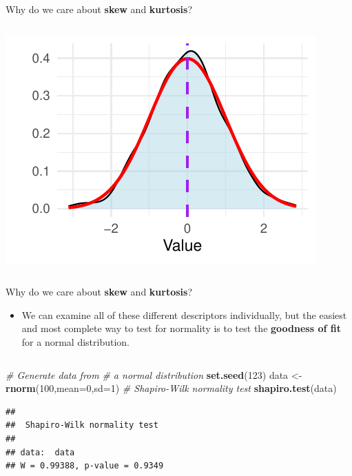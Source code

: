 \documentclass[
  ignorenonframetext,
]{beamer}
\newenvironment{Shaded}{\begin{snugshade}}{\end{snugshade}}
\newcommand{\AttributeTok}[1]{\textcolor[rgb]{0.13,0.29,0.53}{#1}}
\newcommand{\CommentTok}[1]{\textcolor[rgb]{0.56,0.35,0.01}{\textit{#1}}}
\newcommand{\DecValTok}[1]{\textcolor[rgb]{0.00,0.00,0.81}{#1}}
\newcommand{\FunctionTok}[1]{\textcolor[rgb]{0.13,0.29,0.53}{\textbf{#1}}}
\newcommand{\NormalTok}[1]{#1}
\newcommand{\OtherTok}[1]{\textcolor[rgb]{0.56,0.35,0.01}{#1}}
\providecommand{\tightlist}{%
  \setlength{\itemsep}{0pt}\setlength{\parskip}{0pt}}
\begin{document}
\begin{frame}{Why do we care about \textbf{skew} and \textbf{kurtosis}?}
\begin{columns}[T]
\begin{column}{0.48\textwidth}
\includegraphics{M4-Descriptice-Statistics_files/figure-beamer/unnamed-chunk-24-1.pdf}
\end{column}
\end{columns}
\end{frame}

\begin{frame}[fragile]{Why do we care about \textbf{skew} and
\textbf{kurtosis}?}
\label{why-do-we-care-about-skew-and-kurtosis-1}
\begin{itemize}
\tightlist
\item
  We can examine all of these different descriptors individually, but
  the easiest and most complete way to test for normality is to test the
  \textbf{goodness of fit} for a normal distribution.
\end{itemize}

\begin{columns}[T]
\begin{column}{0.48\textwidth}
\begin{Shaded}
\begin{Highlighting}[]
\CommentTok{\# Generate data from }
\CommentTok{\# a normal distribution}
\FunctionTok{set.seed}\NormalTok{(}\DecValTok{123}\NormalTok{)}
\NormalTok{data }\OtherTok{\textless{}{-}} \FunctionTok{rnorm}\NormalTok{(}\DecValTok{100}\NormalTok{,}\AttributeTok{mean=}\DecValTok{0}\NormalTok{,}\AttributeTok{sd=}\DecValTok{1}\NormalTok{)}
\CommentTok{\# Shapiro{-}Wilk normality test}
\FunctionTok{shapiro.test}\NormalTok{(data)}
\end{Highlighting}
\end{Shaded}

\begin{verbatim}
## 
##  Shapiro-Wilk normality test
## 
## data:  data
## W = 0.99388, p-value = 0.9349
\end{verbatim}
\end{column}

\begin{column}{0.48\textwidth}
\end{column}
\end{columns}
\end{frame}
\end{document}
